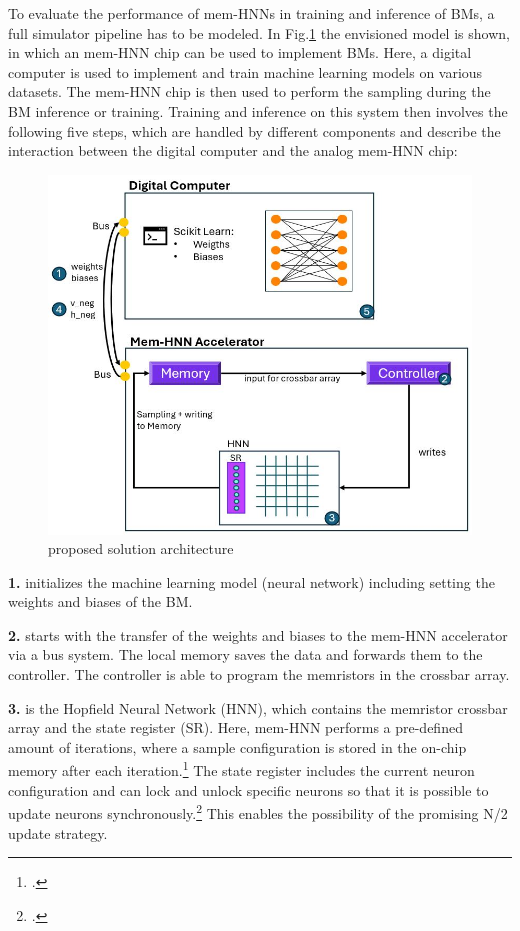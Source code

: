 To evaluate the performance of \ac{mem-HNN}s in training and inference of \ac{BM}s, a full simulator pipeline has to be modeled.
In Fig.\ref{Overall architecture} the envisioned model is shown, in which an \ac{mem-HNN} chip can be used to implement \ac{BM}s.
Here, a digital computer is used to implement and train machine learning models on various datasets.
The \ac{mem-HNN} chip is then used to perform the sampling during the \ac{BM} inference or training.
Training and inference on this system then involves the following five steps, which are handled by different components and describe the interaction between the digital computer and the analog \ac{mem-HNN} chip:
\begin{figure}[H]
    \centering
    \includegraphics[width=0.80\linewidth]{graphics/Analysemodell.JPG}
    \caption{proposed solution architecture}
    \label{Overall architecture}
\end{figure}
\textbf{1.} initializes the machine learning model (neural network) including setting the weights and biases of the \ac{BM}. 

\textbf{2.} starts with the transfer of the weights and biases to the \ac{mem-HNN} accelerator via a bus system. 
The local memory saves the data and forwards them to the controller. 
The controller is able to program the memristors in the crossbar array. 

\textbf{3.} is the Hopfield Neural Network (HNN), which contains the memristor crossbar array and the state register (SR).
Here, \ac{mem-HNN} performs a pre-defined amount of iterations, where a sample configuration is stored in the on-chip memory after each iteration.\footcite[cf.][18]{caiHarnessingIntrinsicNoise2019}
The state register includes the current neuron configuration and can lock and unlock specific neurons so that it is possible to update neurons synchronously.\footcite[cf.][18]{caiHarnessingIntrinsicNoise2019}
This enables the possibility of the promising N/2 update strategy.

